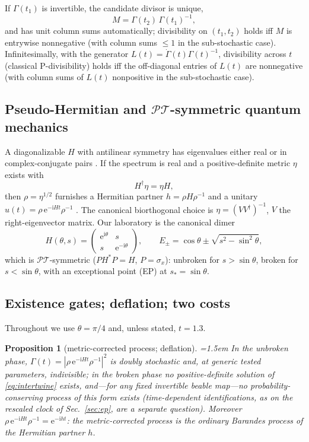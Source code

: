 \documentclass[11pt]{article}
\newtheorem{proposition}[theorem]{Proposition}
\theoremstyle{definition}
\theoremstyle{remark}
\newcommand{\PT}{\mathcal{PT}}
\newcommand{\ii}{\mathrm{i}}
\newcommand{\ee}{\mathrm{e}}
\newcommand{\Gam}{\Gamma}
\begin{document}
If $\Gam(t_1)$ is invertible, the candidate divisor is unique,
\begin{equation}
M=\Gam(t_2)\,\Gam(t_1)^{-1},
\label{eq:divisor}
\end{equation}
and has unit column sums automatically; divisibility on $(t_1,t_2)$ holds
iff $M$ is entrywise nonnegative (with column sums $\le 1$ in the
sub-stochastic case). Infinitesimally, with the generator
$L(t)=\dot\Gam(t)\Gam(t)^{-1}$, divisibility across $t$ (classical
P-divisibility) holds iff the off-diagonal entries of $L(t)$ are
nonnegative (with column sums of $L(t)$ nonpositive in the
sub-stochastic case).

\subsection{Pseudo-Hermitian and \texorpdfstring{$\PT$}{PT}-symmetric quantum mechanics}

A diagonalizable $H$ with antilinear symmetry has eigenvalues either real
or in complex-conjugate pairs \cite{Bender2007,Mannheim2018}. If the
spectrum is real and a positive-definite metric $\eta$ exists with
\begin{equation}
H^{\dagger}\eta=\eta H,
\label{eq:intertwine}
\end{equation}
then $\rho=\eta^{1/2}$ furnishes a Hermitian partner
$h=\rho H\rho^{-1}$ and a unitary $u(t)=\rho\,\ee^{-\ii Ht}\rho^{-1}$
\cite{Mostafazadeh2002}. The canonical biorthogonal choice is
$\eta=(VV^{\dagger})^{-1}$, $V$ the right-eigenvector matrix. Our
laboratory is the canonical dimer
\begin{equation}
H(\theta,s)=
\begin{pmatrix}
\ee^{\ii\theta} & s\\[2pt]
s & \ee^{-\ii\theta}
\end{pmatrix},
\qquad
E_{\pm}=\cos\theta\pm\sqrt{s^{2}-\sin^{2}\theta},
\label{eq:dimer}
\end{equation}
which is $\PT$-symmetric ($PH^{*}P=H$, $P=\sigma_x$): unbroken for
$s>\sin\theta$, broken for $s<\sin\theta$, with an exceptional point (EP)
at $s_{*}=\sin\theta$.

\subsection{Existence gates; deflation; two costs}

Throughout we use $\theta=\pi/4$ and, unless stated, $t=1.3$.

\begin{proposition}[metric-corrected process; deflation]
\label{prop:deflation}
\emergencystretch=1.5em
In the unbroken phase, $\Gam(t)=|\rho\,\ee^{-\ii Ht}\rho^{-1}|^{2}$ is
doubly stochastic and, at generic tested parameters, indivisible; in the broken phase no
positive-definite solution of \eqref{eq:intertwine} exists, and---for any
fixed invertible beable map---no probability-conserving process of this
form exists (time-dependent identifications, as on the rescaled clock of
Sec.~\ref{sec:ep}, are a separate question). Moreover $\rho\,\ee^{-\ii Ht}\rho^{-1}=\ee^{-\ii ht}$: the
metric-corrected process is the ordinary Barandes process of the Hermitian
partner $h$.
\end{proposition}
\end{document}
